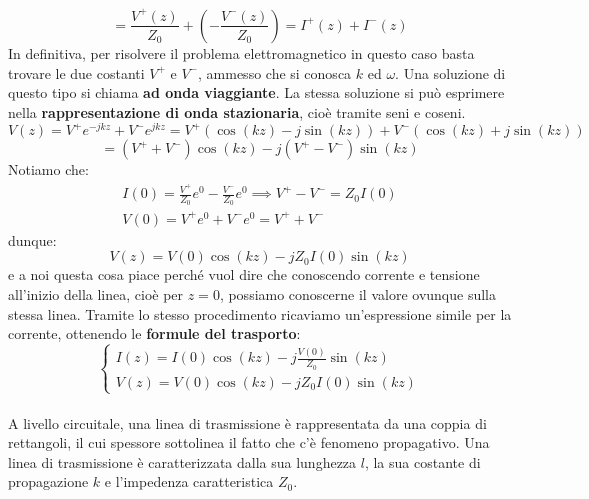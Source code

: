 \documentclass{book}
\begin{document}
        \begin{equation}
            = \frac{V^{+}(z)}{Z_{0}}+(-\frac{V^{-}(z)}{Z_{0}})=I^{+}(z)+I^{-}(z)
        \end{equation}
        In definitiva, per risolvere il problema elettromagnetico in questo caso basta trovare le due costanti  $V^{+}$ e $V^{-}$, ammesso che si conosca 
        $k$ ed $\omega$. Una soluzione di questo tipo si chiama \textbf{ad onda viaggiante}.
        La stessa soluzione si può esprimere nella \textbf{rappresentazione di onda stazionaria}, cioè tramite seni e coseni.
        \begin{equation}
            V(z)=V^{+}e^{-jkz}+V^{-}e^{jkz}=V^{+}(\cos(kz)-j\sin(kz))+V^{-}(\cos(kz)+j\sin(kz))
        \end{equation}
        \begin{equation}
            =(V^{+}+V^{-})\cos(kz)-j(V^{+}-V^{-})\sin(kz)
        \end{equation}
        Notiamo che:
        \begin{align}
            I(0)=\frac{V^{+}}{Z_{0}}e^{0}-\frac{V^{-}}{Z_{0}}e^{0} \implies V^{+}-V^{-}=Z_{0}I(0) \\
            V(0)=V^{+}e^{0}+V^{-}e^{0}=V^{+}+V^{-}
        \end{align}
        dunque:
        \begin{equation}
            V(z)=V(0)\cos(kz)-jZ_{0}I(0)\sin(kz)
        \end{equation}
        e a noi questa cosa piace perché vuol dire che conoscendo corrente e tensione all'inizio della linea, cioè per
        $z=0$, possiamo conoscerne il valore ovunque sulla stessa linea. Tramite lo 
        stesso procedimento ricaviamo un'espressione simile per la corrente, ottenendo le \textbf{formule del trasporto}:
        \begin{equation}
            \begin{cases}
                \displaystyle I(z) = I(0)\cos(kz)-j\frac{V(0)}{Z_{0}}\sin(kz) \\
                V(z) = V(0)\cos(kz)-jZ_{0}I(0)\sin(kz)
            \end{cases}
        \end{equation}
        \\ 
        A livello circuitale, una linea di trasmissione è rappresentata da una coppia di rettangoli, il cui 
        spessore sottolinea il fatto che c'è fenomeno propagativo. Una linea di trasmissione è caratterizzata dalla sua lunghezza $l$,
        la sua costante di propagazione $k$ e l'impedenza caratteristica $Z_{0}$. 
\end{document}

